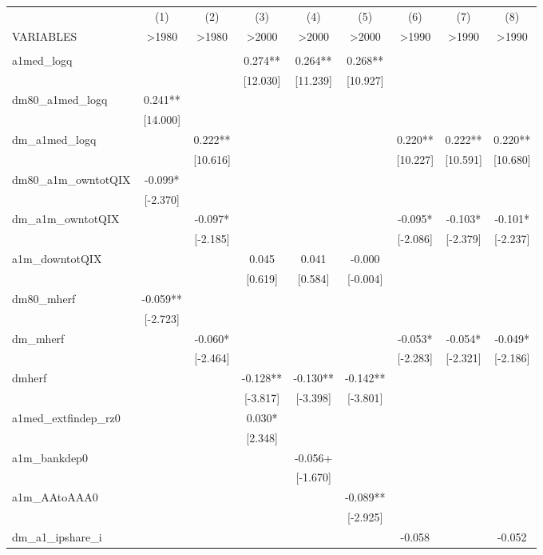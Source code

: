 \documentclass[]{article}
\begin{document}
\begin{tabular}{lcccccccc} \hline
 & (1) & (2) & (3) & (4) & (5) & (6) & (7) & (8) \\
VARIABLES & >1980 & >1980 & >2000 & >2000 & >2000 & >1990 & >1990 & >1990 \\ \hline
 &  &  &  &  &  &  &  &  \\
a1med\_logq &  &  & 0.274** & 0.264** & 0.268** &  &  &  \\
 &  &  & [12.030] & [11.239] & [10.927] &  &  &  \\
dm80\_a1med\_logq & 0.241** &  &  &  &  &  &  &  \\
 & [14.000] &  &  &  &  &  &  &  \\
dm\_a1med\_logq &  & 0.222** &  &  &  & 0.220** & 0.222** & 0.220** \\
 &  & [10.616] &  &  &  & [10.227] & [10.591] & [10.680] \\
dm80\_a1m\_owntotQIX & -0.099* &  &  &  &  &  &  &  \\
 & [-2.370] &  &  &  &  &  &  &  \\
dm\_a1m\_owntotQIX &  & -0.097* &  &  &  & -0.095* & -0.103* & -0.101* \\
 &  & [-2.185] &  &  &  & [-2.086] & [-2.379] & [-2.237] \\
a1m\_downtotQIX &  &  & 0.045 & 0.041 & -0.000 &  &  &  \\
 &  &  & [0.619] & [0.584] & [-0.004] &  &  &  \\
dm80\_mherf & -0.059** &  &  &  &  &  &  &  \\
 & [-2.723] &  &  &  &  &  &  &  \\
dm\_mherf &  & -0.060* &  &  &  & -0.053* & -0.054* & -0.049* \\
 &  & [-2.464] &  &  &  & [-2.283] & [-2.321] & [-2.186] \\
dmherf &  &  & -0.128** & -0.130** & -0.142** &  &  &  \\
 &  &  & [-3.817] & [-3.398] & [-3.801] &  &  &  \\
a1med\_extfindep\_rz0 &  &  & 0.030* &  &  &  &  &  \\
 &  &  & [2.348] &  &  &  &  &  \\
a1m\_bankdep0 &  &  &  & -0.056+ &  &  &  &  \\
 &  &  &  & [-1.670] &  &  &  &  \\
a1m\_AAtoAAA0 &  &  &  &  & -0.089** &  &  &  \\
 &  &  &  &  & [-2.925] &  &  &  \\
dm\_a1\_ipshare\_i &  &  &  &  &  & -0.058 &  & -0.052 \\

\end{tabular}
\end{document}
